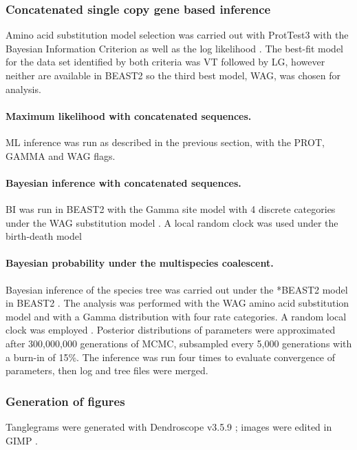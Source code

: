\documentclass[12pt]{article}
\begin{document}
\subsubsection{Concatenated single copy gene based inference}
Amino acid substitution model selection was carried out with ProtTest3 with the Bayesian Information Criterion as well as the log likelihood \cite{darriba2011prottest,guindon2003simple}. 
The best-fit model for the data set identified by both criteria was VT followed by LG, however neither are available in BEAST2 so the third best model, WAG, was chosen for analysis. 
\paragraph{Maximum likelihood with concatenated sequences.}
ML inference was run as described in the previous section, with the PROT, GAMMA and WAG flags.
\paragraph{Bayesian inference with concatenated sequences.}
BI was run in BEAST2 with the Gamma site model with 4 discrete categories under the WAG substitution model \cite{whelan2001general}. A local random clock was used under the birth-death model %
\paragraph{Bayesian probability under the multispecies coalescent.}
Bayesian inference of the species tree was carried out under the *BEAST2 model in BEAST2 \cite{bouckaert2014beast}. 
The analysis was performed with the WAG amino acid substitution model \cite{whelan2001general} and with a Gamma distribution with four rate categories. 
A random local clock was employed \cite{drummond2010bayesian}. 
Posterior distributions of parameters were approximated after 300,000,000 generations of MCMC, subsampled every 5,000 generations with a burn-in of 15\%. 
The inference was run four times to evaluate convergence of parameters, then log and tree files were merged. 



\subsubsection{Generation of figures}
Tanglegrams were generated with Dendroscope v3.5.9 \cite{huson2007dendroscope}; images were edited in GIMP \cite{gimp}.
\end{document}
